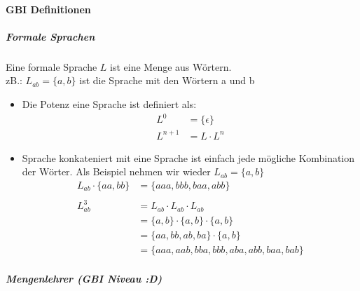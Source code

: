 \documentclass[12pt]{article}
\begin{document}
\paragraph{\Large GBI Definitionen}
\large\subparagraph{\large Formale Sprachen}
\normalsize
\begin{flushleft}
    Eine formale Sprache $L$ ist eine Menge aus Wörtern. \\
    zB.: $L_{ab} = \{a,b\}$ ist die Sprache mit den Wörtern a und b
    \begin{itemize}
        \item Die Potenz eine Sprache ist definiert als: \\
        \begin{align*}
            L^0 &= \{\epsilon\} \\
            L^{n + 1} &= L \cdot L^n
        \end{align*}
        \item Sprache konkateniert mit eine Sprache ist einfach jede mögliche Kombination der Wörter. Als Beispiel nehmen wir wieder $L_{ab} = \{a,b\}$
        \begin{align*}
            L_{ab} \cdot \{aa,bb\} &= \{aaa,bbb,baa,abb\} \\ \\
            L_{ab}^3 &= L_{ab} \cdot L_{ab} \cdot L_{ab} \\
            &= \{a,b\} \cdot \{a,b\} \cdot \{a,b\} \\
            &= \{aa,bb,ab,ba\} \cdot \{a,b\} \\
            &= \{aaa,aab,bba,bbb,aba,abb,baa,bab\}
        \end{align*}
    \end{itemize}
\end{flushleft}
\large\subparagraph{\large Mengenlehrer (GBI Niveau :D)}
\normalsize
\end{document}
